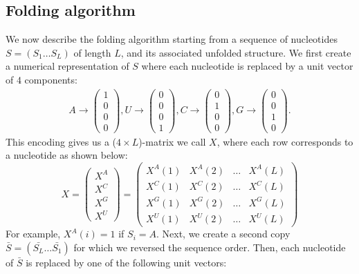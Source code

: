 \subsection*{Folding algorithm}
We now describe the folding algorithm starting from a sequence of nucleotides \(S=(S_1\dots S_L)\) of length \(L\), and its associated unfolded structure. We first create a numerical representation of \(S\) where each nucleotide is replaced by a unit vector of $4$ components:
\begin{equation}
\begin{split}
A \rightarrow \begin{pmatrix} 1\\ 0\\ 0\\ 0 \end{pmatrix},
U \rightarrow \begin{pmatrix} 0\\ 0\\ 0\\ 1 \end{pmatrix},
C \rightarrow \begin{pmatrix} 0\\ 1\\ 0\\ 0 \end{pmatrix},
G \rightarrow \begin{pmatrix} 0\\ 0\\ 1\\ 0 \end{pmatrix}.
\end{split}
\end{equation}
This encoding gives us a (\(4 \times L\))-matrix we call \(X\), where each row corresponds to a nucleotide as shown below:
\begin{equation}
X = \begin{pmatrix} X^A\\ X^C\\ X^G\\ X^U \end{pmatrix} = \begin{pmatrix} X^A(1) &X^A(2) &\dots &X^A(L) \\ X^C(1) &X^C(2) &\dots &X^C(L)\\ X^G(1) &X^G(2) &\dots &X^G(L)\\ X^U(1) &X^U(2) &\dots &X^U(L) \end{pmatrix}
\end{equation}
For example, \(X^A(i) = 1\) if \(S_i = A\). Next, we create a second copy \(\bar{S}=(\bar{S_L}\dots \bar{S_1})\) for which we reversed the sequence order. Then, each nucleotide of \(\bar{S}\) is replaced by one of the following unit vectors:
